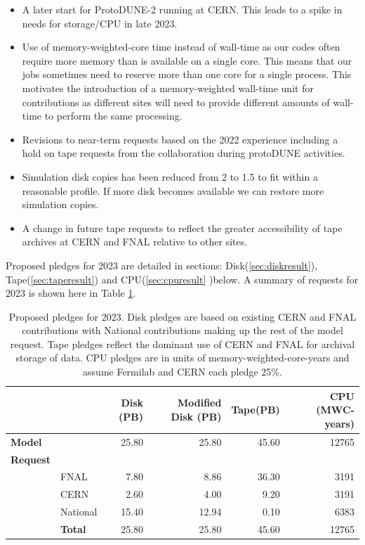 \documentclass[12pt]{article}
\begin{document}
\begin{itemize}
\item A later start for ProtoDUNE-2 running at CERN. This leads to a spike in needs for storage/CPU in late 2023. 
\item Use of memory-weighted-core time instead of wall-time as our codes often require more memory than is available on a single core.  This means that our jobs sometimes need to reserve more than one core for a single process. This motivates the introduction of a memory-weighted wall-time unit for contributions  as different sites will  need to provide different amounts of wall-time to perform the same processing. 
\item Revisions to near-term requests based on the 2022 experience including a hold on tape requests from the collaboration during protoDUNE activities. 
\item Simulation disk copies has been reduced from 2 to 1.5 to fit within a reasonable profile.  If more disk becomes available we can restore more simulation copies.  
\item A change in future tape requests to reflect the greater accessibility of tape archives at CERN and FNAL relative to other sites. 
\end{itemize}

Proposed pledges for 2023 are detailed  in sections: Disk(\ref{sec:diskresult}), Tape(\ref{sec:taperesult}) and CPU(\ref{sec:cpuresult} )below.   A summary of requests for 2023 is shown here in Table \ref{tab:summary2023}.

\begin{table}[ht]
\begin{centering}

\begin{tabular}{|ll|rr|r|r|}
\hline
 	&&	Disk (PB)	&	Modified Disk (PB)	&	Tape(PB)	&	CPU (MWC-years)	\\
	\hline
{\bf Model}	&&	25.80	&	25.80	&	45.60	&	12765	\\
\hline
{\bf Request}	&&		&		&		&		\\
&FNAL	&	7.80	&	8.86	&	36.30	&	3191	\\
&CERN	&	2.60	&	4.00	&	9.20	&	3191	\\
&National	&	15.40	&	12.94	&	0.10	&	6383	\\
\hline
&{\bf Total}	&	25.80	&	25.80	&	45.60	&	12765	\\
\hline
\end{tabular}

\caption{Proposed pledges for 2023.  Disk pledges are based on existing CERN and FNAL contributions with National contributions making up the rest of the model request.  Tape pledges reflect the dominant use of CERN and FNAL for archival storage of data.  CPU pledges are in units of memory-weighted-core-years and assume Fermilab and CERN each pledge 25\%.   }
\end{centering}
\label{tab:summary2023}
\end{table}
\end{document}
